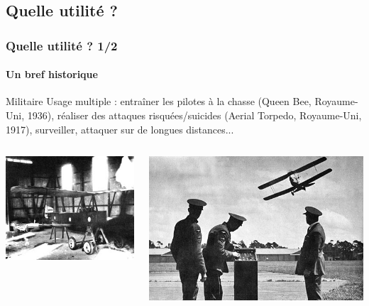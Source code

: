 \documentclass{beamer}
\begin{document}
\subsection{Quelle utilité ?}
\begin{frame}
  \frametitle{Quelle utilité ? 1/2}
  \framesubtitle{Un bref historique}
  \begin{block}{Militaire}
    Usage multiple : entraîner les pilotes à la chasse (Queen Bee, Royaume-Uni, 1936), réaliser des attaques risquées/suicides (Aerial Torpedo, Royaume-Uni, 1917), surveiller, attaquer sur de longues distances...
  \end{block}
  \begin{columns}
    \begin{column}{.4\textwidth}
      \includegraphics[width=\textwidth]{../Images/aerial_torpedo.jpg}
    \end{column}
    \begin{column}{.5\textwidth}
      \includegraphics[width=\textwidth]{../Images/Queen_Bee.jpg}
    \end{column}
  \end{columns}
\end{frame}
\end{document}
